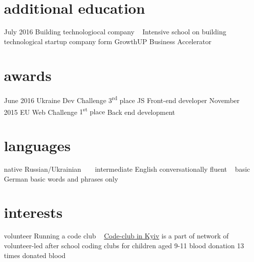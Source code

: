 \documentclass[hidelinks,a4paper]{cv}
\begin{document}
\newpage{}


\section{additional education}
\begin{entrylist}
  \entry
   {July 2016}
   {Building technologiocal company}
   {~}
   {Intensive school on building technological startup company form
   GrowthUP Business Accelerator}
\end{entrylist}

\section{awards}
\begin{entrylist}
  \entry
   {June 2016}
   {Ukraine Dev Challenge}
   {3\textsuperscript{rd} place}
   {JS Front-end developer}
  \entry  
   {November 2015}
   {EU Web Challenge}
   {1\textsuperscript{st} place}
   {Back end development}
\end{entrylist}

\section{languages}
\begin{entrylist}
  \entry
   {native}
   {Russian/Ukrainian}
   {~}
   {~}
  \entry
   {intermediate}
   {English}
   {conversationally fluent}
   {~}
  \entry
   {basic}
   {German}
   {basic words and phrases only}
   {~}
\end{entrylist}

\section{interests}
\begin{entrylist}
   \entry
    {volunteer}
    {Running a code club}
    {~}
    {\href{https://www.codeclub.org.uk/}{Code-club in Kyiv} is a part of network of volunteer-led after school coding clubs for children aged 9-11}
   \entry
    {blood donation}
    {13 times donated blood}
    {~}
    {~}
\end{entrylist}
\end{document}
